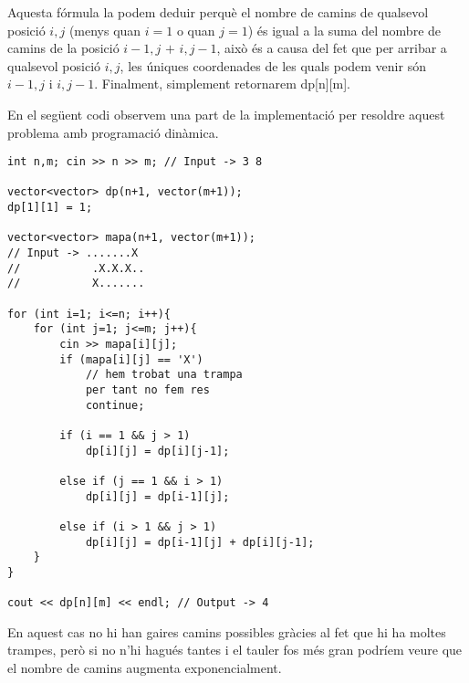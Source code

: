 Aquesta fórmula la podem deduir perquè el nombre de camins de qualsevol posició $i, j$ (menys quan $i = 1$ o quan $j = 1$) és igual a la suma del nombre de camins de la posició $i-1,j$ $+$ $i,j-1$, això és a causa del fet que per arribar a qualsevol posició $i,j$, les úniques coordenades de les quals podem venir són $i-1,j$ i $i,j-1$.
Finalment, simplement retornarem dp[n][m].

En el següent codi observem una part de la implementació per resoldre aquest problema amb programació dinàmica.

\begin{lstlisting}
int n,m; cin >> n >> m; // Input -> 3 8

vector<vector> dp(n+1, vector(m+1));
dp[1][1] = 1;

vector<vector> mapa(n+1, vector(m+1));
// Input -> .......X
//           .X.X.X..
//           X.......

for (int i=1; i<=n; i++){
    for (int j=1; j<=m; j++){
        cin >> mapa[i][j];
        if (mapa[i][j] == 'X') 
            // hem trobat una trampa 
            per tant no fem res
            continue; 
    
        if (i == 1 && j > 1)
            dp[i][j] = dp[i][j-1];
            
        else if (j == 1 && i > 1)
            dp[i][j] = dp[i-1][j];
            
        else if (i > 1 && j > 1)
            dp[i][j] = dp[i-1][j] + dp[i][j-1];
    }
}

cout << dp[n][m] << endl; // Output -> 4
\end{lstlisting}

En aquest cas no hi han gaires camins possibles gràcies al fet que hi ha moltes trampes, però si no n'hi hagués tantes i el tauler fos més gran podríem veure que el nombre de camins augmenta exponencialment.

